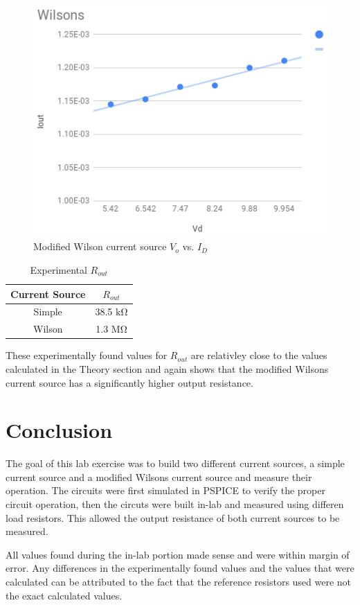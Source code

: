 \documentclass[11pt]{article}
\begin{document}
	\begin{figure}[H]
		\centering
		\includegraphics[width=4.0 in]{wilson_rout.png}
		\caption{Modified Wilson current source $V_o$ vs. $I_D$}
		\label{fig:wilson_r}
	\end{figure}

	\begin{table}[H]
		\centering
		\caption{Experimental $R_{out}$}
		\label{table:rout}
		\begin{tabular}{|c|c|}
			\hline
			Current Source & $R_{out}$\\
			\hline
			Simple & 38.5 $\si{\kilo\ohm}$\\
			Wilson & 1.3 $\si{\mega\ohm}$\\
			\hline
		\end{tabular}
	\end{table}
	
	These experimentally found values for $R_{out}$ are relativley close to
	the values calculated in the Theory section and again shows that the
	modified Wilsons current source has a significantly higher output
	resistance.


	\section{Conclusion}
	The goal of this lab exercise was to build two different current sources,
	a simple current source and a modified Wilsons current source and measure
	their operation. The circuits were first simulated in PSPICE to verify the
	proper circuit operation, then the circuts were built in-lab and measured
	using differen load resistors. This allowed the output resistance of both
	current sources to be measured.\\

	\hfill \break

	All values found during the in-lab portion made sense and were within margin
	of error. Any differences in the experimentally found values and the values
	that were calculated can be attributed to the fact that the reference resistors
	used were not the exact calculated values. 
\end{document}
